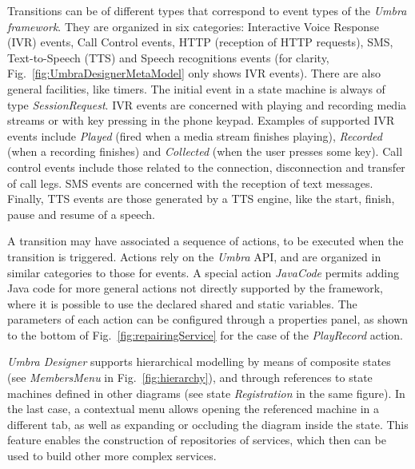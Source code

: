 Transitions can be of different types that correspond to event types of the {\em Umbra framework}. 
They are organized in six categories: Interactive Voice Response (IVR) events, Call Control events, 
HTTP (reception of HTTP requests), SMS, Text-to-Speech (TTS) and Speech recognitions events 
(for clarity, Fig.~\ref{fig:UmbraDesignerMetaModel} only shows IVR events). There are also general 
facilities, like timers. The initial event in a state machine is always of type {\em SessionRequest}.
IVR events are concerned with playing and recording media streams or with key pressing in the phone keypad. 
Examples of supported IVR events include {\em Played} (fired when a media stream finishes playing), 
{\em Recorded} (when a recording finishes) and {\em Collected} (when the user presses some key). 
Call control events include those related to the connection, disconnection and transfer of call legs. SMS 
events are concerned with the reception of text messages. Finally, TTS events are those generated by 
a TTS engine, like the start, finish, pause and resume of a speech.

A transition may have associated a sequence of actions, to be executed when the transition is triggered. 
Actions rely on the {\em Umbra} API, and are organized in similar categories to those for events. A 
special action {\em JavaCode} permits adding Java code for more general actions not directly supported 
by the framework, where it is possible to use the declared shared and static variables. The parameters 
of each action can be configured through a properties panel, as shown to the bottom of Fig.~\ref{fig:repairingService} 
for the case of the {\em PlayRecord} action.

{\em Umbra Designer} supports hierarchical modelling by means of composite states (see {\em MembersMenu}
in Fig.~\ref{fig:hierarchy}), and through references to state machines defined in other diagrams (see state 
{\em Registration} in the same figure). In the last case, a contextual menu allows opening the referenced 
machine in a different tab, as well as expanding or occluding the diagram inside the state. This feature enables
the construction of repositories of services, which then can be used to build other more complex services.



